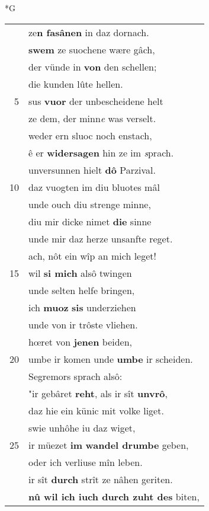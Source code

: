 \documentclass[8pt,a4paper,notitlepage]{article}
\begin{document}
\begin{table}[ht]
\begin{minipage}[t]{0.5\linewidth}
\small
\begin{center}*G
\end{center}
\begin{tabular}{rl}
 & ze\textbf{n fasânen} in daz dornach.\\ 
 & \textbf{swem} ze suochene wære gâch,\\ 
 & der vünde in \textbf{von} den schellen;\\ 
 & die kunden lûte hellen.\\ 
5 & sus \textbf{vuor} der unbescheidene helt\\ 
 & ze dem, der minn\textit{e} was verselt.\\ 
 & weder ern sluoc noch enstach,\\ 
 & ê er \textbf{widersagen} hin ze im \textit{s}prach.\\ 
 & unversunnen hielt \textbf{dô} Parzival.\\ 
10 & daz vuogten im diu bluotes mâl\\ 
 & unde ouch diu strenge minne,\\ 
 & diu mir dicke nimet \textbf{die} sinne\\ 
 & unde mir daz herze unsanfte reget.\\ 
 & ach, nôt ein wîp an mich leget!\\ 
15 & wil \textbf{si mich} alsô twingen\\ 
 & unde selten helfe bringen,\\ 
 & ich \textbf{muoz} \textbf{sis} underziehen\\ 
 & unde von ir trôste vliehen.\\ 
 & hœret von \textbf{jenen} beiden,\\ 
20 & umbe ir komen unde \textbf{umbe} ir scheiden.\\ 
 & Segremors sprach alsô:\\ 
 & "ir gebâret \textbf{reht}, als ir sît \textbf{unvrô},\\ 
 & daz hie ein künic mit volke liget.\\ 
 & swie unhôhe iu daz wiget,\\ 
25 & ir müezet \textbf{im} \textbf{wandel drumbe} geben,\\ 
 & oder ich verliuse mîn leben.\\ 
 & ir sît \textbf{durch} strît ze nâhen geriten.\\ 
 & \textbf{nû wil ich iuch durch zuht des} biten,\\ 

\end{tabular}
\end{minipage}
\end{table}
\end{document}
